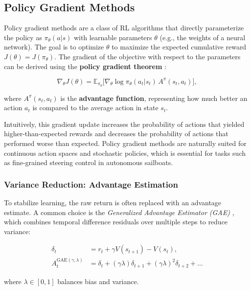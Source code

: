 \subsection{Policy Gradient Methods}
Policy gradient methods are a class of RL algorithms that directly parameterize the policy as $\pi_\theta(a|s)$ with learnable parameters $\theta$ (e.g., the weights of a neural network). The goal is to optimize $\theta$ to maximize the expected cumulative reward $J(\theta) = J(\pi_\theta)$. The gradient of the objective with respect to the parameters can be derived using the \textbf{policy gradient theorem} \cite{sutton2000}:

\begin{equation}
\nabla_\theta J(\theta) = \mathbb{E}_{\pi_\theta} \Big[ \nabla_\theta \log \pi_\theta(a_t|s_t) \, A^\pi(s_t, a_t) \Big],
\end{equation}

where $A^\pi(s_t, a_t)$ is the \textbf{advantage function}, representing how much better an action $a_t$ is compared to the average action in state $s_t$.  

Intuitively, this gradient update increases the probability of actions that yielded higher-than-expected rewards and decreases the probability of actions that performed worse than expected. Policy gradient methods are naturally suited for continuous action spaces and stochastic policies, which is essential for tasks such as fine-grained steering control in autonomous sailboats.

\subsubsection{Variance Reduction: Advantage Estimation}

To stabilize learning, the raw return is often replaced with an advantage estimate. A common choice is the \emph{Generalized Advantage Estimator (GAE)} \cite{schulman2015high}, which combines temporal difference residuals over multiple steps to reduce variance:

\begin{align}
\delta_t &= r_t + \gamma V(s_{t+1}) - V(s_t), \\
A_t^{\text{GAE}(\gamma, \lambda)} &= \delta_t + (\gamma \lambda) \delta_{t+1} + (\gamma \lambda)^2 \delta_{t+2} + \dots
\end{align}

where $\lambda \in [0,1]$ balances bias and variance.




